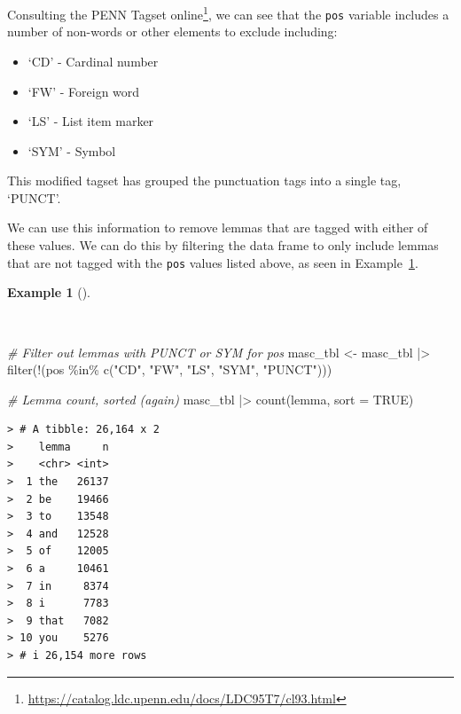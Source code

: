 \documentclass[
  letterpaper,
  DIV=11,
  numbers=noendperiod]{scrreport}
\newenvironment{Shaded}{\begin{snugshade}}{\end{snugshade}}
\newcommand{\AttributeTok}[1]{\textcolor[rgb]{0.00,0.00,0.00}{#1}}
\newcommand{\CommentTok}[1]{\textcolor[rgb]{0.00,0.00,0.00}{\textit{#1}}}
\newcommand{\ConstantTok}[1]{\textcolor[rgb]{0.00,0.00,0.00}{#1}}
\newcommand{\FunctionTok}[1]{\textcolor[rgb]{0.00,0.00,0.00}{#1}}
\newcommand{\NormalTok}[1]{\textcolor[rgb]{0.00,0.00,0.00}{#1}}
\newcommand{\OtherTok}[1]{\textcolor[rgb]{0.00,0.00,0.00}{#1}}
\newcommand{\SpecialCharTok}[1]{\textcolor[rgb]{0.00,0.00,0.00}{#1}}
\newcommand{\StringTok}[1]{\textcolor[rgb]{0.00,0.00,0.00}{#1}}
\providecommand{\tightlist}{%
  \setlength{\itemsep}{0pt}\setlength{\parskip}{0pt}}\usepackage{longtable,booktabs,array}
\theoremstyle{definition}
\newtheorem{example}{Example}[chapter]
\theoremstyle{remark}
\DeclareRobustCommand{\href}[2]{#2\footnote{\url{#1}}}
\begin{document}
Consulting the
\href{https://catalog.ldc.upenn.edu/docs/LDC95T7/cl93.html}{PENN Tagset
online}, we can see that the \texttt{pos} variable includes a number of
non-words or other elements to exclude including:

\begin{itemize}
\tightlist
\item
  `CD' - Cardinal number
\item
  `FW' - Foreign word
\item
  `LS' - List item marker
\item
  `SYM' - Symbol
\end{itemize}

This modified tagset has grouped the punctuation tags into a single tag,
`PUNCT'.

We can use this information to remove lemmas that are tagged with either
of these values. We can do this by filtering the data frame to only
include lemmas that are not tagged with the \texttt{pos} values listed
above, as seen in Example~\ref{exm-eda-masc-count-filter}.

\begin{example}[]\protect\hypertarget{exm-eda-masc-count-filter}{}\label{exm-eda-masc-count-filter}

~

\begin{Shaded}
\begin{Highlighting}[]
\CommentTok{\# Filter out lemmas with PUNCT or SYM for pos}
\NormalTok{masc\_tbl }\OtherTok{\textless{}{-}} 
\NormalTok{  masc\_tbl }\SpecialCharTok{|\textgreater{}} 
  \FunctionTok{filter}\NormalTok{(}\SpecialCharTok{!}\NormalTok{(pos }\SpecialCharTok{\%in\%} \FunctionTok{c}\NormalTok{(}\StringTok{"CD"}\NormalTok{, }\StringTok{"FW"}\NormalTok{, }\StringTok{"LS"}\NormalTok{, }\StringTok{"SYM"}\NormalTok{, }\StringTok{"PUNCT"}\NormalTok{)))}

\CommentTok{\# Lemma count, sorted (again)}
\NormalTok{masc\_tbl }\SpecialCharTok{|\textgreater{}} 
  \FunctionTok{count}\NormalTok{(lemma, }\AttributeTok{sort =} \ConstantTok{TRUE}\NormalTok{)}
\end{Highlighting}
\end{Shaded}

\begin{verbatim}
> # A tibble: 26,164 x 2
>    lemma     n
>    <chr> <int>
>  1 the   26137
>  2 be    19466
>  3 to    13548
>  4 and   12528
>  5 of    12005
>  6 a     10461
>  7 in     8374
>  8 i      7783
>  9 that   7082
> 10 you    5276
> # i 26,154 more rows
\end{verbatim}

\end{example}
\end{document}
